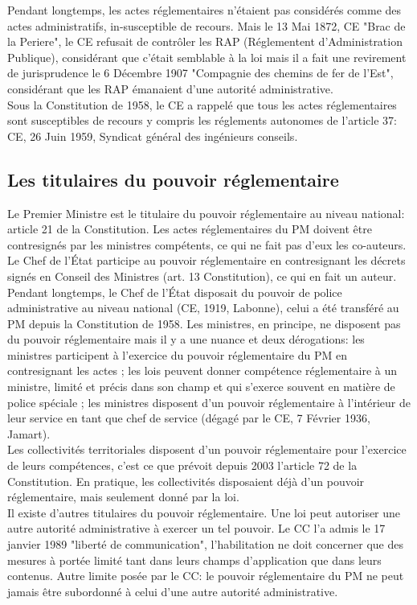 \documentclass[10pt, a4paper, openany]{book}
\begin{document}
Pendant longtemps, les actes réglementaires n'étaient pas considérés comme des actes administratifs, in-susceptible de recours. Mais le 13 Mai 1872, CE "Brac de la Periere", le CE refusait de contrôler les RAP (Réglementent d'Administration Publique), considérant que c'était semblable à la loi mais il a fait une revirement de jurisprudence le 6 Décembre 1907 "Compagnie des chemins de fer de l'Est", considérant que les RAP émanaient d'une autorité administrative. \\
Sous la Constitution de 1958, le CE a rappelé que tous les actes réglementaires sont susceptibles de recours y compris les réglements autonomes de l'article 37: CE, 26 Juin 1959, Syndicat général des ingénieurs conseils. 

\subsection{Les titulaires du pouvoir réglementaire}

Le Premier Ministre est le titulaire du pouvoir réglementaire au niveau national: article 21 de la Constitution. Les actes réglementaires du PM doivent être contresignés par les ministres compétents, ce qui ne fait pas d'eux les co-auteurs. \\
Le Chef de l'État participe au pouvoir réglementaire en contresignant les décrets signés en Conseil des Ministres (art. 13 Constitution), ce qui en fait un auteur. Pendant longtemps, le Chef de l'État disposait du pouvoir de police administrative au niveau national (CE, 1919, Labonne), celui a été transféré au PM depuis la Constitution de 1958. Les ministres, en principe, ne disposent pas du pouvoir réglementaire mais il y a une nuance et deux dérogations: les ministres participent à l'exercice du pouvoir réglementaire du PM en contresignant les actes ; les lois peuvent donner compétence réglementaire à un ministre, limité et précis dans son champ et qui s'exerce souvent en matière de police spéciale ; les ministres disposent d'un pouvoir réglementaire à l'intérieur de leur service en tant que chef de service (dégagé par le CE, 7 Février 1936, Jamart). \\
Les collectivités territoriales disposent d'un pouvoir réglementaire pour l'exercice de leurs compétences, c'est ce que prévoit depuis 2003 l'article 72 de la Constitution. En pratique, les collectivités disposaient déjà d'un pouvoir réglementaire, mais seulement donné par la loi. \\
Il existe d'autres titulaires du pouvoir réglementaire. Une loi peut autoriser une autre autorité administrative à exercer un tel pouvoir. Le CC l'a admis le 17 janvier 1989 "liberté de communication", l'habilitation ne doit concerner que des mesures à portée limité tant dans leurs champs d'application que dans leurs contenus. Autre limite posée par le CC: le pouvoir réglementaire du PM ne peut jamais être subordonné à celui d'une autre autorité administrative. 
\end{document}
